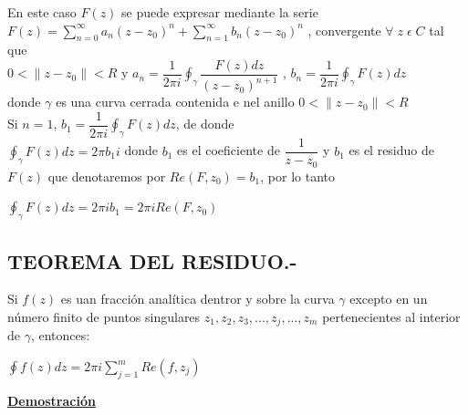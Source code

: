 \documentclass[10pt,a4paper]{article}
\begin{document}
En este caso $F(z)$ se puede expresar mediante la serie \\
$\displaystyle{F(z) = \sum_{n = 0}^{\infty} a_n(z-z_0)^n + \sum_{n = 1}^{\infty} b_n(z-z_0)^n}$ , convergente $\forall \; z \; \epsilon \; C$ tal que \\
$\displaystyle{0 < \parallel z - z_0 \parallel < R}$ y $\displaystyle{a_n = \dfrac{1}{2 \pi i } \oint_{\gamma} \dfrac{F(z)dz}{(z-z_0)^{n+1}}}$ , $\displaystyle {b_n = \dfrac{1}{2 \pi i } \oint_{\gamma} F(z) dz}$ \\
donde $\gamma$ es una curva cerrada contenida e nel anillo $0 < \parallel z - z_0 \parallel < R$ \\
Si $n = 1$, $\displaystyle {b_1= \dfrac{1}{2 \pi i} \oint_{\gamma} F(z) dz}$, de donde \\
$\displaystyle{\oint_{\gamma} F(z)dz = 2 \pi b_1 i}$ donde $b_1$ es el coeficiente de $\dfrac{1}{z-z_0}$ y $b_1$ es el residuo de $F(z)$ que denotaremos por $Re(F,z_0) = b_1$, por lo tanto\\
\begin{center}
$\displaystyle{\oint_{\gamma} F(z)dz = 2 \pi i b_1 = 2 \pi i Re(F,z_0)}$\\
\end{center}
\subsection{TEOREMA DEL RESIDUO.-}
Si $f(z)$ es uan fracción analítica dentror y sobre la curva $\gamma$ excepto en un número finito de puntos singulares $z_1,z_2,z_3,...,z_j,...,z_m$ pertenecientes al interior de $\gamma$, entonces: \\
\begin{center}
$\displaystyle{\oint f(z)dz = 2 \pi i \sum_{j = 1}^m Re(f,z_j)}$
\end{center}
\begin{center}
\textbf{\underline{Demostración}}
\end{center}
\end{document}
